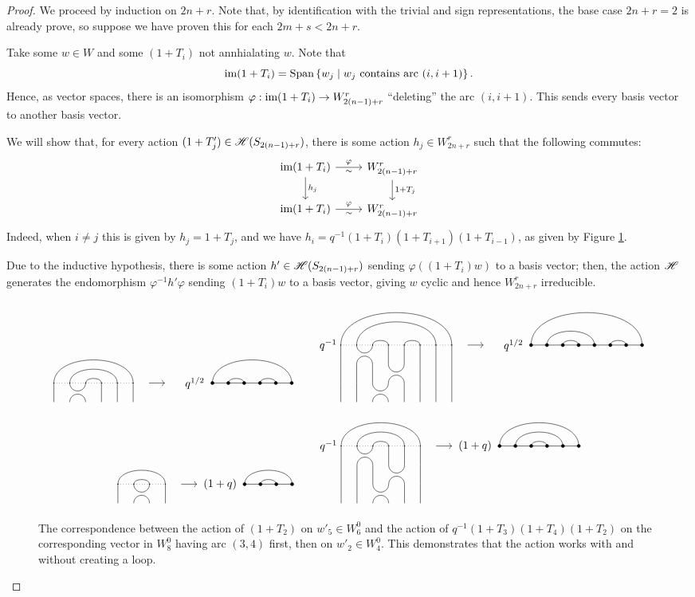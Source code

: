 \documentclass{amsart}
\begin{document}
\begin{proof}
  We proceed by induction on $2n + r$.
  Note that, by identification with the trivial and sign representations, the base case $2n + r = 2$ is already prove, so suppose we have proven this for each $2m + s < 2n + r$.

  Take some $w \in W$ and some $(1 + T_i)$ not annhialating $w$.
  Note that \[\text{im} (1 + T_i) = \text{Span}\left\{ w_j \mid w_j \text{ contains arc }(i,i+1) \right\}.\]
  Hence, as vector spaces, there is an isomorphism $\varphi:\text{im}(1 + T_i) \rightarrow W_{2(n-1) + r}^r$ ``deleting'' the arc $(i,i+1)$.
  This sends every basis vector to another basis vector.

  We will show that, for every action $(1 + T_j') \in \mathscr{H}(S_{2(n-1) + r})$, there is some action $h_j \in W_{2n + r}^r$ such that the following commutes:
  \[
    \begin{tikzcd}
      \ima (1 + T_i) \arrow[r,"\varphi" above, "\sim" below] \arrow[d,"h_j"] & W_{2(n-1) + r}^r \arrow[d,"1 + T_j"]\\
      \ima (1 + T_i) \arrow[r,"\varphi" above, "\sim" below] & W_{2(n-1) + r}^r
    \end{tikzcd}
  \]
  Indeed, when $i \neq j$ this is given by $h_j = 1 + T_j$, and we have $h_i = q^{-1}(1 + T_i)(1 + T_{i+1})(1 + T_{i-1})$, as given by Figure \ref{bigloop}.
  
  Due to the inductive hypothesis, there is some action $h' \in \mathscr{H}(S_{2(n-1) + r})$ sending $\varphi((1 + T_i)w)$ to a basis vector;
  then, the action $\mathscr{H}$ generates the endomorphism $\varphi^{-1}h'\varphi$ sending $(1 + T_i)w$ to a basis vector, giving $w$ cyclic and hence $W_{2n + r}^r$ irreducible.
  \begin{figure}
  \[
    \Action{6}{1/6, 2/5, 3/4}{2}{1/6, 2/3, 4/5 }{q^{1/2}} \hspace{20pt} 
    \IsoAction{8}{1/8, 2/7, 3/4, 5/6}{3}{1/8, 2/5, 3/4, 6/7}{q^{1/2}}
  \]
  \[
    \Action{4}{1/4, 2/3}{2}{1/4,2/3}{(1 + q)} \hspace{20pt}
    \IsoAction{6}{1/6, 2/5, 3/4}{3}{1/6, 2/5, 3/4}{(1 + q)}
  \]
  \caption{The correspondence between the action of $(1 + T_2)$ on $w'_5 \in W^0_6$ and the action of $q^{-1}(1 + T_3)(1 + T_4)(1 + T_2)$ on the corresponding vector in $W^0_8$ having arc $(3,4)$ first, then on $w'_2 \in W^0_4$.
  This demonstrates that the action works with and without creating a loop.
  }
  \label{bigloop}
  \end{figure}
\end{proof}
\end{document}
